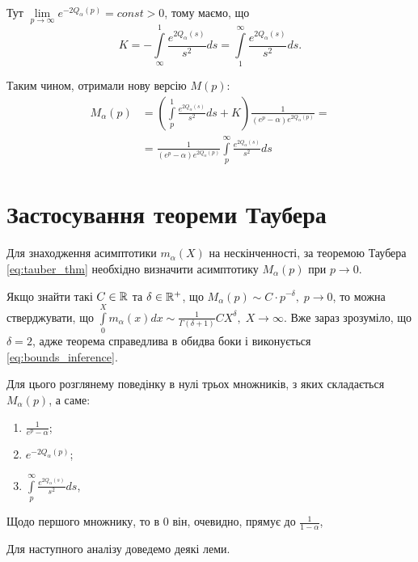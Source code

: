 Тут $\lim\limits_{p\rightarrow \infty} e^{- 2Q_\alpha(p)} = const > 0$, тому маємо, що
\begin{equation}
	K = -  \int\limits_\infty^1 \frac{e^{2Q_\alpha(s)}}{s^2} ds =  \int\limits_1^\infty \frac{e^{2Q_\alpha(s)}}{s^2} ds.
\end{equation}

Таким чином, отримали нову версію $M(p)$:
\begin{equation}
\begin{split}
	\label{eq:uniform_right_laplace_sol}
	M_\alpha(p)&= \left( \int\limits_p^1 \frac{e^{2Q_\alpha(s)}}{s^2} ds + K \right) \frac{1}{(e^p - \alpha)  e^{2Q_\alpha(p)}}
 = \\
	&=\frac{1}{(e^p - \alpha)  e^{2Q_\alpha(p)}} \int\limits_p^\infty \frac{e^{2Q_\alpha(s)}}{s^2} ds
\end{split}
\end{equation}

\section{Застосування теореми Таубера}

Для знаходження асимптотики $m_\alpha(X)$ на нескінченності, за теоремою Таубера \eqref{eq:tauber_thm} необхідно визначити асимптотику $M_\alpha(p)$ при $p \rightarrow 0$.

Якщо знайти такі $C \in \mathbb{R}$ та $\delta \in \mathbb{R}^+$, що $M_\alpha(p) \sim C \cdot p^{-\delta}, \; p \rightarrow 0$, то можна стверджувати, що $\int\limits_0^X m_\alpha(x) dx \sim \frac{1}{\Gamma(\delta + 1)} C X^\delta, \; X \rightarrow \infty$. Вже зараз зрозуміло, що $\delta = 2$, адже теорема справедлива в обидва боки і виконується \eqref{eq:bounds_inference}.

Для цього розглянему поведінку в нулі трьох множників, з яких складається $M_\alpha(p)$, а саме:
\begin{enumerate}
	\item $\frac{1}{e^p - \alpha}$;
	\item $e^{-2Q_\alpha(p)}$;
	\item $\int\limits_p^\infty \frac{e^{2Q_\alpha(s)}}{s^2} ds$,
\end{enumerate}

Щодо першого множнику, то в 0 він, очевидно, прямує до $\frac{1}{1-\alpha}$,

Для наступного аналізу доведемо деякі леми.

